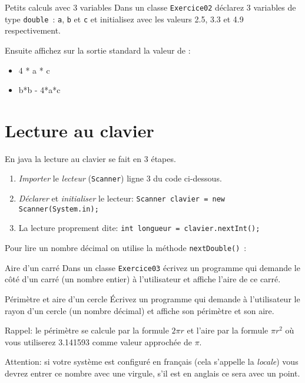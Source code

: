 \documentclass[a4paper,11pt]{style-esi/td}
\begin{document}
\begin{Exercice}{Petits calculs avec 3 variables}
	Dans un classe \texttt{Exercice02} déclarez 3 variables de type \texttt{double}~:
	\texttt{a}, \texttt{b} et \texttt{c} et initialisez avec les valeurs
	2.5, 3.3 et 4.9 respectivement.

	Ensuite affichez sur la sortie standard la valeur de :
	\begin{itemize}
		\item 4 * a * c
		\item b*b - 4*a*c
	\end{itemize}
\end{Exercice}


\newpage
\section{Lecture au clavier}


En java la lecture au clavier se fait en 3 étapes.

\begin{enumerate}
	\item \emph{Importer} le \emph{lecteur} (\texttt{Scanner}) ligne 3 du code ci-dessous.
	\item \emph{Déclarer} et \emph{initialiser} le lecteur:  \texttt{Scanner clavier = new Scanner(System.in);}
	\item La lecture proprement dite: \texttt{int longueur = clavier.nextInt();}
\end{enumerate}


Pour lire un nombre décimal on utilise la méthode \texttt{nextDouble()}~:



\begin{Exercice}{Aire d'un carré}
	Dans un classe \texttt{Exercice03} écrivez un programme qui demande
	le côté d'un carré (un nombre entier) à l'utilisateur et
	affiche l'aire de ce carré.
\end{Exercice}

\begin{Exercice}{Périmètre et aire d'un cercle}
	\'Ecrivez un programme
	qui demande à l'utilisateur le rayon d'un cercle (un nombre décimal)
	et affiche son périmètre et son aire.

	Rappel: le périmètre se calcule par la formule $2\pi r$ et
	l'aire par la formule $\pi r^2$ où vous utiliserez 3.141593 comme valeur
	approchée de $\pi$.

	Attention: si votre système est configuré en français (cela s'appelle la
	\emph{locale})
	vous devrez entrer ce nombre avec une virgule, s'il est en anglais ce sera avec
	un point.
\end{Exercice}
\end{document}

